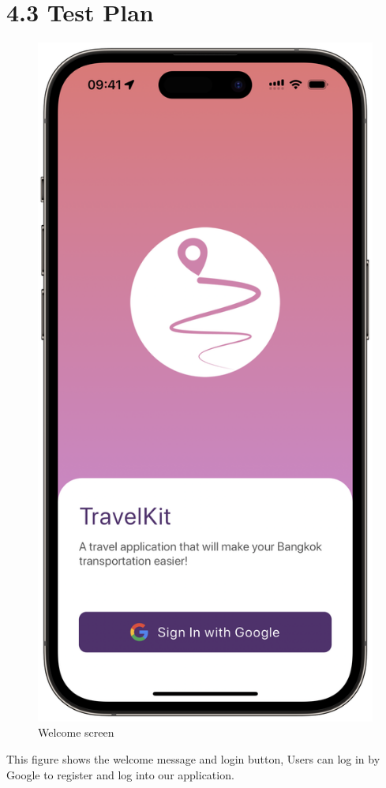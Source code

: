 \section{4.3 Test Plan}
\begin{figure}[!h]
	\centering
	\includegraphics[width=0.5\linewidth]{chapter4/welcome_screen.png}
	\caption{Welcome screen}
	\label{fig:Welcome screen}
\end{figure}
This figure shows the welcome message and login button, Users can log in by Google to register and log into our application.

